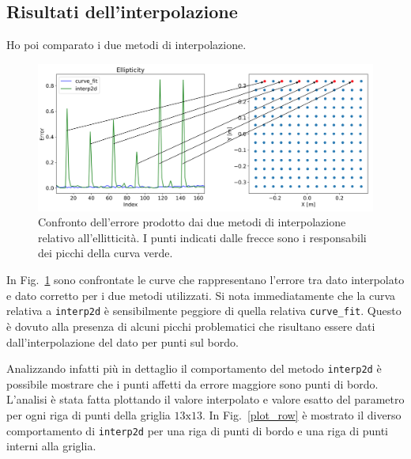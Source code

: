 \documentclass[12pt,a4paper,final]{book}
\begin{document}

\subsection{Risultati dell'interpolazione}\label{risultati_interpolazione}
Ho poi comparato i due metodi di interpolazione.
\begin{figure}[!ht]
	\centering
	\includegraphics[width=\linewidth]{../figures/punti_prob.png}
	\caption{Confronto dell'errore prodotto dai due metodi di interpolazione relativo all'ellitticità. I punti indicati dalle frecce sono i responsabili dei picchi della curva verde.}
	\label{err_int}
\end{figure}
In Fig.~\ref{err_int} sono confrontate le curve che rappresentano l'errore tra dato interpolato e dato corretto per i due metodi utilizzati. Si nota immediatamente che la curva relativa a \texttt{interp2d} è sensibilmente peggiore di quella relativa \texttt{curve\_fit}. Questo è dovuto alla presenza di alcuni picchi problematici che risultano essere dati dall'interpolazione del dato per punti sul bordo.


Analizzando infatti più in dettaglio il comportamento del metodo \texttt{interp2d} è possibile mostrare che i punti affetti da errore maggiore sono punti di bordo. L'analisi è stata fatta plottando il valore interpolato e valore esatto del parametro per ogni riga di punti della griglia $13\text{x}13$.
In Fig.~\ref{plot_row} è mostrato il diverso comportamento di \texttt{interp2d} per una riga di punti di bordo e una riga di punti interni alla griglia.
\end{document}
